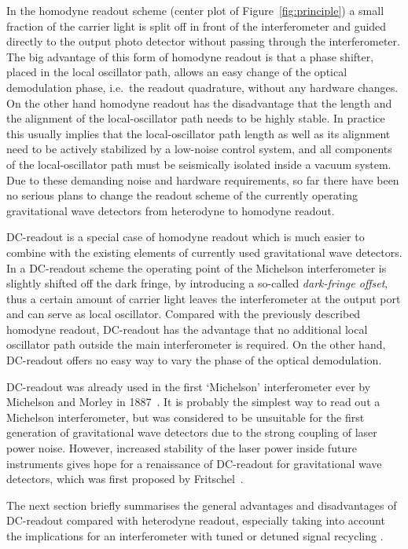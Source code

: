 In the homodyne readout scheme (center plot of Figure~\ref{fig:principle}) a  small
fraction of the carrier light is split off in front of the interferometer and guided directly
to the output photo detector without passing through the interferometer.
The big
advantage of this form of homodyne readout is that a phase shifter,
 placed in the local oscillator path, allows an easy
change of the optical demodulation phase, i.e.\ the readout quadrature,
without any hardware changes. On the other hand homodyne
readout has the disadvantage that the length and the alignment of the local-oscillator path needs to be highly stable.
In practice this usually implies that the local-oscillator path length as well as its alignment need to be actively
stabilized by a low-noise control system, and all components of the local-oscillator path must be
 seismically isolated inside a vacuum system.
Due to these demanding noise and hardware requirements, so far there have
been no serious plans to change
the readout scheme of the currently operating gravitational wave detectors
from heterodyne to homodyne readout.


DC-readout is a special case of homodyne readout which
is much easier to combine with the existing elements of  currently used
gravitational wave detectors.
In a DC-readout  scheme the operating point of the Michelson interferometer is slightly
shifted off the dark fringe, by introducing a so-called \emph{dark-fringe offset},
thus a certain amount of carrier light leaves the interferometer at the output port
 and can serve as local oscillator. Compared with the previously described homodyne readout,
DC-readout has the advantage that no additional local oscillator path outside the main interferometer
is required. On the other hand, DC-readout offers no easy way to vary the phase of the
optical demodulation.

DC-readout was already used in the first `Michelson' interferometer ever by Michelson and Morley
in 1887~\cite{michelson1887}. It is probably the simplest way to read out a Michelson
interferometer, but was considered to be unsuitable for the first generation of gravitational
wave detectors due to the strong coupling of laser power noise. However, increased
stability of the laser power inside future instruments gives hope for a renaissance
of DC-readout for gravitational wave detectors, which was first proposed
by Fritschel~\cite{Fritschel2}. 

The next section briefly summarises the general advantages and disadvantages of
DC-readout compared with heterodyne readout, especially taking into account the implications
for an interferometer with tuned or detuned signal recycling \cite{Hildtuned_detuned2007}.

